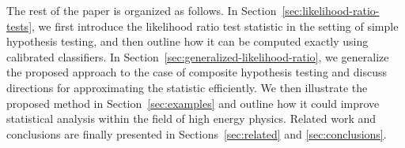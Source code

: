 \documentclass[12pt]{article}
\numberwithin{equation}{section}
\theoremstyle{plain}
\begin{document}
%

The rest of the paper is organized as follows. In
Section~\ref{sec:likelihood-ratio-tests}, we first introduce the likelihood
ratio test statistic in the setting of simple hypothesis testing, and then
outline how it can be computed exactly using calibrated classifiers.
In Section~\ref{sec:generalized-likelihood-ratio}, we generalize the proposed
approach to the case of composite hypothesis testing and discuss directions for
approximating the statistic efficiently. We then illustrate the proposed
method in Section~\ref{sec:examples} and outline how it could improve
statistical analysis within the field of high energy physics. Related work
and conclusions are finally presented in Sections~\ref{sec:related} and \ref{sec:conclusions}.
\end{document}
